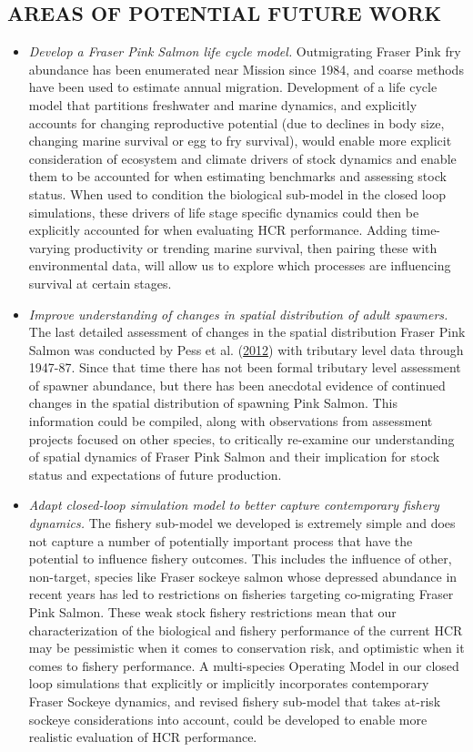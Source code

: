 \documentclass[11pt]{book}
\begin{document}
\hypertarget{areas-of-potential-future-work}{%
\subsection{AREAS OF POTENTIAL FUTURE WORK}\label{areas-of-potential-future-work}}
\begin{itemize}
\item
  \emph{Develop a Fraser Pink Salmon life cycle model.} Outmigrating Fraser Pink fry abundance has been enumerated near Mission since 1984, and coarse methods have been used to estimate annual migration. Development of a life cycle model that partitions freshwater and marine dynamics, and explicitly accounts for changing reproductive potential (due to declines in body size, changing marine survival or egg to fry survival), would enable more explicit consideration of ecosystem and climate drivers of stock dynamics and enable them to be accounted for when estimating benchmarks and assessing stock status. When used to condition the biological sub-model in the closed loop simulations, these drivers of life stage specific dynamics could then be explicitly accounted for when evaluating HCR performance. Adding time-varying productivity or trending marine survival, then pairing these with environmental data, will allow us to explore which processes are influencing survival at certain stages.
\item
  \emph{Improve understanding of changes in spatial distribution of adult spawners.} The last detailed assessment of changes in the spatial distribution Fraser Pink Salmon was conducted by Pess et al. (\protect\hyperlink{ref-pessInfluencePopulationDynamics2012}{2012}) with tributary level data through 1947-87. Since that time there has not been formal tributary level assessment of spawner abundance, but there has been anecdotal evidence of continued changes in the spatial distribution of spawning Pink Salmon. This information could be compiled, along with observations from assessment projects focused on other species, to critically re-examine our understanding of spatial dynamics of Fraser Pink Salmon and their implication for stock status and expectations of future production.
\item
  \emph{Adapt closed-loop simulation model to better capture contemporary fishery dynamics.} The fishery sub-model we developed is extremely simple and does not capture a number of potentially important process that have the potential to influence fishery outcomes. This includes the influence of other, non-target, species like Fraser sockeye salmon whose depressed abundance in recent years has led to restrictions on fisheries targeting co-migrating Fraser Pink Salmon. These weak stock fishery restrictions mean that our characterization of the biological and fishery performance of the current HCR may be pessimistic when it comes to conservation risk, and optimistic when it comes to fishery performance. A multi-species Operating Model in our closed loop simulations that explicitly or implicitly incorporates contemporary Fraser Sockeye dynamics, and revised fishery sub-model that takes at-risk sockeye considerations into account, could be developed to enable more realistic evaluation of HCR performance.
\end{itemize}
\end{document}
